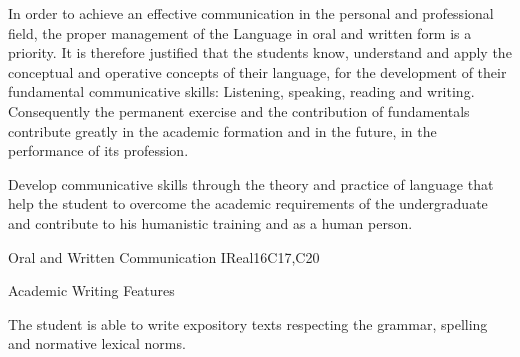 \begin{syllabus}


\begin{justification}
In order to achieve an effective communication in the personal and professional field, the proper management of the Language in oral and written form is a priority. It is therefore justified that the students know, understand and apply the conceptual and operative concepts of their language, for the development of their fundamental communicative skills: Listening, speaking, reading and writing.
Consequently the permanent exercise and the contribution of fundamentals contribute greatly in the academic formation and in the future, in the performance of its profession.
\end{justification}

\begin{goals}
\item Develop communicative skills through the theory and practice of language that help the student to overcome the academic requirements of the undergraduate and contribute to his humanistic training and as a human person.
\end{goals}

\begin{outcomes}
   \item {}
   \item {}
   \item {}
\end{outcomes}

\begin{competences}
    \item {}
    \item {}
    \item {}
\end{competences}

\begin{unit}{}{Oral and Written Communication I}{Real}{16}{C17,C20}
\begin{topics}
      \item Academic Writing Features
\end{topics}

\begin{learningoutcomes}
   \item The student is able to write expository texts respecting the grammar, spelling and normative lexical norms.
\end{learningoutcomes}
\end{unit}

\begin{coursebibliography}
\end{coursebibliography}

\end{syllabus}
